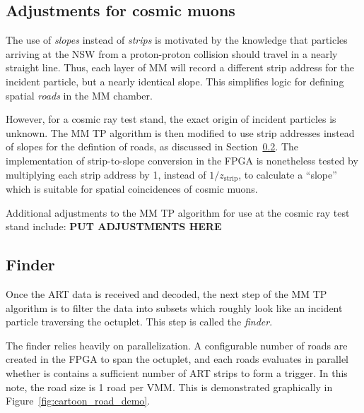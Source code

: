 \subsection{Adjustments for cosmic muons}
\label{sec:alg-crts}

The use of \textit{slopes} instead of \textit{strips} is motivated by the knowledge that particles arriving at the NSW from a proton-proton collision should travel in a nearly straight line. Thus, each layer of MM will record a different strip address for the incident particle, but a nearly identical slope. This simplifies logic for defining spatial \textit{roads} in the MM chamber.

However, for a cosmic ray test stand, the exact origin of incident particles is unknown. The MM TP algorithm is then modified to use strip addresses instead of slopes for the defintion of roads, as discussed in Section~\ref{sec:alg-finder}. The implementation of strip-to-slope conversion in the FPGA is nonetheless tested by multiplying each strip address by 1, instead of $1/z_\text{strip}$, to calculate a ``slope'' which is suitable for spatial coincidences of cosmic muons.

Additional adjustments to the MM TP algorithm for use at the cosmic ray test stand include: \textbf{PUT ADJUSTMENTS HERE}

\subsection{Finder}
\label{sec:alg-finder}

Once the ART data is received and decoded, the next step of the MM TP algorithm is to filter the data into subsets which roughly look like an incident particle traversing the octuplet. This step is called the \textit{finder}.

The finder relies heavily on parallelization. A configurable number of roads are created in the FPGA to span the octuplet, and each roads evaluates in parallel whether is contains a sufficient number of ART strips to form a trigger. In this note, the road size is 1 road per VMM. This is demonstrated graphically in Figure~\ref{fig:cartoon_road_demo}.

